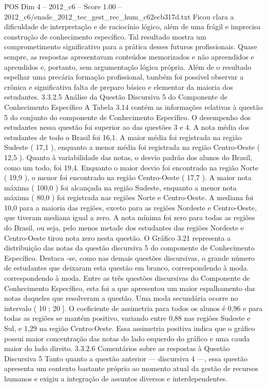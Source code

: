 \begin{textsample}{POS Dim 4 – 2012\_c6 – Score 1.00 – 2012\_c6/enade\_2012\_tec\_gest\_rec\_hum\_c62ecb317d.txt}
Ficou clara a dificuldade de interpretação e de raciocínio lógico, além de uma frágil e imprecisa construção de conhecimento específico.
Tal resultado mostra um comprometimento significativo para a prática desses futuros profissionais.
Quase sempre, as respostas apresentavam conteúdos memorizados e não apreendidos e aprendidos e, portanto, sem argumentação lógica própria.
Além de o resultado espelhar uma precária formação profissional, também foi possível observar a crônica e significativa falta de preparo básico e elementar da maioria dos estudantes. 3.3.2.5 Análise da Questão Discursiva 5 do Componente de Conhecimento Específico A Tabela 3.14 contém as informações relativas à questão 5 do conjunto do componente de Conhecimento Específico.
O desempenho dos estudantes nessa questão foi superior ao das questões 3 e 4.
A nota média dos estudantes de todo o Brasil foi 16,1.
A maior média foi registrada na região Sudeste ( 17,1 ), enquanto a menor média foi registrada na região Centro-Oeste ( 12,5 ).
Quanto à variabilidade das notas, o desvio padrão dos alunos do Brasil, como um todo, foi 19,4.
Enquanto o maior desvio foi encontrado na região Norte ( 19,9 ), o menor foi encontrado na região Centro-Oeste ( 17,7 ).
A maior nota máxima ( 100,0 ) foi alcançada na região Sudeste, enquanto a menor nota máxima ( 80,0 ) foi registrada nas regiões Norte e Centro-Oeste.
A mediana foi 10,0 para a maioria das regiões, exceto para as regiões Nordeste e Centro-Oeste, que tiveram mediana igual a zero.
A nota mínima foi zero para todas as regiões do Brasil, ou seja, pelo menos metade dos estudantes das regiões Nordeste e Centro-Oeste tirou nota zero nesta questão.
O Gráfico 3.21 representa a distribuição das notas da questão discursiva 5 do componente de Conhecimento Específico.
Destaca -se, como nas demais questões discursivas, o grande número de estudantes que deixaram esta questão em branco, correspondendo à moda. correspondendo à moda.
Entre as três questões discursivas do Componente de Conhecimento Específico, esta foi a que apresentou um maior espalhamento das notas daqueles que resolveram a questão.
Uma moda secundária ocorre no intervalo ( 10 ; 20 ].
O coeficiente de assimetria para todos os alunos é 0,96 e para todas as regiões se mantém positivo, variando entre 0,88 nas regiões Sudeste e Sul, e 1,29 na região Centro-Oeste.
Essa assimetria positiva indica que o gráfico possui maior concentração das notas do lado esquerdo do gráfico e uma cauda maior do lado direito. 3.3.2.6 Comentários sobre as respostas à Questão Discursiva 5 Tanto quanto a questão anterior — discursiva 4 —, essa questão apresenta um contexto bastante próprio ao momento atual da gestão de recursos humanos e exigiu a integração de assuntos diversos e interdependentes.

\end{textsample}
